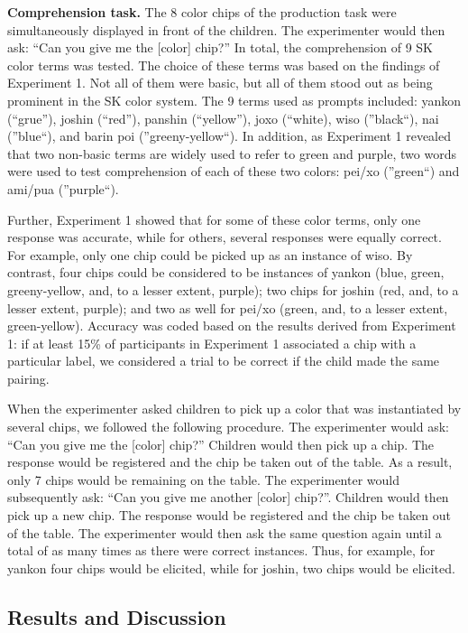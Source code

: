 \documentclass[,man,floatsintext]{apa6}
\theoremstyle{definition}
\theoremstyle{definition}
\theoremstyle{definition}
\theoremstyle{remark}
\begin{document}
\textbf{Comprehension task.} The 8 color chips of the production task
were simultaneously displayed in front of the children. The experimenter
would then ask: \enquote{Can you give me the {[}color{]} chip?} In
total, the comprehension of 9 SK color terms was tested. The choice of
these terms was based on the findings of Experiment 1. Not all of them
were basic, but all of them stood out as being prominent in the SK color
system. The 9 terms used as prompts included: yankon (\enquote{grue}),
joshin (\enquote{red}), panshin (\enquote{yellow}), joxo
(\enquote{white), wiso (}black\enquote{), nai (}blue\enquote{), and
barin poi (}greeny-yellow\enquote{). In addition, as Experiment 1
revealed that two non-basic terms are widely used to refer to green and
purple, two words were used to test comprehension of each of these two
colors: pei/xo (}green\enquote{) and ami/pua (}purple``).

Further, Experiment 1 showed that for some of these color terms, only
one response was accurate, while for others, several responses were
equally correct. For example, only one chip could be picked up as an
instance of wiso. By contrast, four chips could be considered to be
instances of yankon (blue, green, greeny-yellow, and, to a lesser
extent, purple); two chips for joshin (red, and, to a lesser extent,
purple); and two as well for pei/xo (green, and, to a lesser extent,
green-yellow). Accuracy was coded based on the results derived from
Experiment 1: if at least 15\% of participants in Experiment 1
associated a chip with a particular label, we considered a trial to be
correct if the child made the same pairing.

When the experimenter asked children to pick up a color that was
instantiated by several chips, we followed the following procedure. The
experimenter would ask: \enquote{Can you give me the {[}color{]} chip?}
Children would then pick up a chip. The response would be registered and
the chip be taken out of the table. As a result, only 7 chips would be
remaining on the table. The experimenter would subsequently ask:
\enquote{Can you give me another {[}color{]} chip?}. Children would then
pick up a new chip. The response would be registered and the chip be
taken out of the table. The experimenter would then ask the same
question again until a total of as many times as there were correct
instances. Thus, for example, for yankon four chips would be elicited,
while for joshin, two chips would be elicited.

\subsection{Results and Discussion}\label{results-and-discussion-1}
\end{document}
